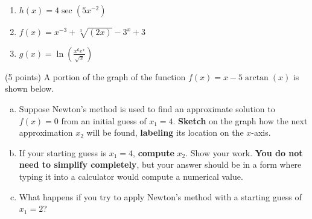 \documentclass[12pt]{article}
\renewcommand{\emph}[1]{\textsf{\textbf{#1}}}
\let\ds\displaystyle
\newcounter{probcount}
\newcounter{subprobcount}
\newenvironment{subproblems}{%
\begin{enumerate}%
\setcounter{enumi}{\value{subprobcount}}%
\renewcommand{\theenumi}{\emph{\alph{enumi}}}}%
{\setcounter{subprobcount}{\value{enumi}}\end{enumerate}}
\begin{document}
\begin{subproblems}
\item $\ds h(x)=4\sec\left(5x^{-2}\right)$ %
	\vfill
\item  $\ds f(x)=x^{-3}+\sqrt[3]{(2x)}-3^x+3$
	\vfill
	\item $\ds g(x)=\ln\left(\frac{x^6e^x}{\sqrt{x}}\right)$
	\vfill
	

\end{subproblems}

\newpage

\fbox{\emph{Extra Credit}} (5 points) A portion of the graph of the function $f(x)=x - 5 \arctan(x)$ is shown below.

\begin{enumerate}[a.]%
	\item Suppose Newton's method is used to find an approximate solution to
	$f(x)=0$ from an initial guess of $x_1=4$. \emph{Sketch} on the graph how the
	next approximation $x_2$ will be found, \emph{labeling}
	its location on the $x$-axis.
	\item If your starting guess is $x_1=4$, \emph{compute} $x_2$. Show your work. \emph{You do not need to simplify completely}, but your answer should be in a
form where typing it into a calculator would compute a numerical value. 
		\vfill
		
		\vfill
	
	\item What happens if you try to apply Newton's method with a starting guess of $x_{1} = 2$?
	\vfill
\end{enumerate}

\newpage
\end{document}
